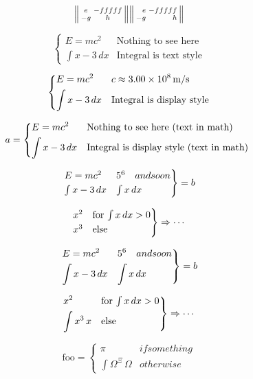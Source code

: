 \documentclass{article}
\newcommand{\horz}{\noindent\makebox[\linewidth]{\rule{\paperwidth}{0.4pt}}}
\begin{document}
\[
\begin{Vsmallmatrix*} e & -fffff \\ -g & h \end{Vsmallmatrix*}
\begin{Vsmallmatrix*}[r] e & -fffff \\ -g & h \end{Vsmallmatrix*}
\]

\horz

\[
\begin{cases}
E = m c^2 & \text{Nothing to see here} \\
\int x-3\, dx & \text{Integral is text style}
\end{cases}
\]

\[
\begin{dcases}
E = m c^2 & c \approx 3.00\times 10^{8}\,\mathrm{m}/\mathrm{s} \\
\int x-3\, dx & \text{Integral is display style}
\end{dcases}
\]

\[
a= \begin{dcases*}
E = m c^2 & Nothing to see here (text in math) \\
\int x-3\, dx & Integral is display style (text in math)
\end{dcases*}
\]

\[
\begin{rcases}
E = m c^2 & 5^6 \quad and so on \\
\int x-3\, dx & \int x \, dx
\end{rcases} = b
\]

\[
\begin{rcases*}
x^2 & for $\int x\,dx>0$\\
x^3 & else
\end{rcases*} \Rightarrow \cdots
\]

\[
\begin{drcases}
E = m c^2 & 5^6 \quad and so on \\
\int x-3\, dx & \int x \, dx
\end{drcases} = b
\]

\[
\begin{drcases*}
x^2 & for $\int x\,dx>0$\\
\int x^3\,x & else
\end{drcases*} \Rightarrow \cdots
\]

\[
\text{foo} = \begin{cases*}
\pi & if something\\
\int \Omega^\Xi\,\Omega & otherwise
\end{cases*}
\]
\end{document}
